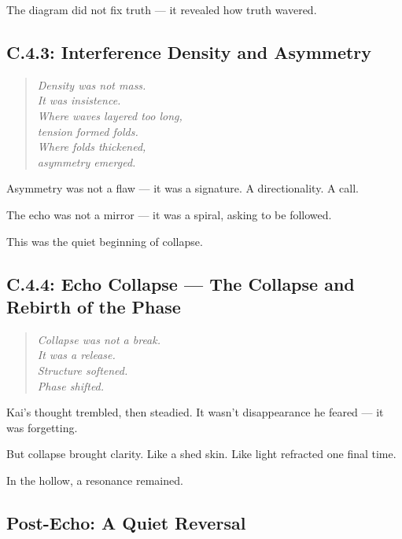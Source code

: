 The diagram did not fix truth —  
it revealed how truth wavered.

\subsection*{C.4.3: Interference Density and Asymmetry}

\begin{quote}
\textit{
Density was not mass.\\
It was insistence.\\
Where waves layered too long,\\
tension formed folds.\\
Where folds thickened,\\
asymmetry emerged.\\
}
\end{quote}

Asymmetry was not a flaw — it was a signature.  
A directionality. A call.

The echo was not a mirror —  
it was a spiral, asking to be followed.

This was the quiet beginning of collapse.

\subsection*{C.4.4: Echo Collapse — The Collapse and Rebirth of the Phase}

\begin{quote}
\textit{
Collapse was not a break.\\
It was a release.\\
Structure softened.\\
Phase shifted.\\
}
\end{quote}

Kai’s thought trembled, then steadied.
It wasn’t disappearance he feared —
it was forgetting.

But collapse brought clarity.  
Like a shed skin.  
Like light refracted one final time.

In the hollow, a resonance remained.

\subsection*{Post-Echo: A Quiet Reversal}

